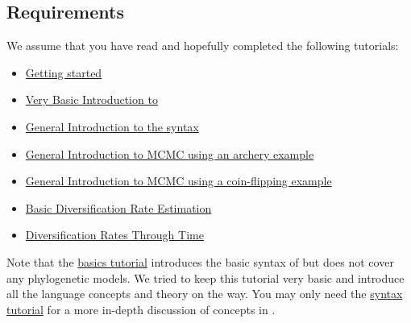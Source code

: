 \subsection{Requirements}
We assume that you have read and hopefully completed the following tutorials:
\begin{itemize}
\item \href{https://github.com/revbayes/revbayes_tutorial/raw/master/tutorial_TeX/RB_Getting_Started/RB_Getting_Started.pdf}{Getting started}
\item \href{https://github.com/revbayes/revbayes_tutorial/raw/master/tutorial_TeX/RB_Intro_Tutorial/RB_Intro_Tutorial.pdf}{Very Basic Introduction to \Rev}
\item \href{https://github.com/revbayes/revbayes_tutorial/raw/master/tutorial_TeX/RB_Rev_Tutorial/RB_Rev_Tutorial.pdf}{General Introduction to the \Rev syntax}
\item \href{https://github.com/revbayes/revbayes_tutorial/raw/master/tutorial_TeX/RB_MCMC_Archery_Tutorial/RB_MCMC_Archery_Tutorial.pdf}{General Introduction to MCMC using an archery example}
\item \href{https://github.com/revbayes/revbayes_tutorial/raw/master/tutorial_TeX/RB_MCMC_Binomial_Tutorial/RB_MCMC_Binomial_Tutorial.pdf}{General Introduction to MCMC using a coin-flipping example}
\item \href{https://github.com/revbayes/revbayes_tutorial/raw/master/tutorial_TeX/RB_DiversificationRate_Tutorial/RB_DiversificationRate_Tutorial.pdf}{Basic Diversification Rate Estimation}
\item \href{https://github.com/revbayes/revbayes_tutorial/raw/master/tutorial_TeX/RB_DiversificationRate_Episodic_Tutorial/RB_DiversificationRate_Episodic_Tutorial.pdf}{Diversification Rates Through Time}
\end{itemize}
Note that the \href{https://github.com/revbayes/revbayes_tutorial/raw/master/tutorial_TeX/RB_Intro_Tutorial/RB_Intro_Tutorial.pdf}{\Rev basics tutorial} introduces the basic syntax of \Rev but does not cover any phylogenetic models.
We tried to keep this tutorial very basic and introduce all the language concepts and theory on the way.
You may only need the \href{https://github.com/revbayes/revbayes_tutorial/raw/master/tutorial_TeX/RB_Rev_Tutorial/RB_Rev_Tutorial.pdf}{\Rev syntax tutorial} for a more in-depth discussion of concepts in \Rev.

